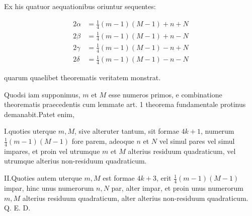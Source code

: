 Ex his quatuor aequationibus oriuntur sequentes:

\[
\begin{aligned}
2\alpha&=\tfrac14(m-1)(M-1)+n+N\\
2\beta&=\tfrac14(m-1)(M-1)+n-N\\
2\gamma&=\tfrac14(m-1)(M-1)-n+N\\
2\delta&=\tfrac14(m-1)(M-1)-n-N
\end{aligned}
\]

quarum quaelibet theorematis veritatem monstrat.


Quodsi iam supponimus, $m$ et $M$ esse numeros primos, e combinatione theorematis praecedentis cum lemmate art. 1 theorema fundamentale protinus demanabit.\quad Patet enim,

I.\quad quoties uterque $m,M$, sive alteruter tantum, sit formae $4k+1$, numerum $\frac14(m-1)(M-1)$ fore parem, adeoque $n$ et $N$ vel simul pares vel simul impares, et proin vel utrumque $m$ et $M$ alterius residuum quadraticum, vel utrumque alterius non-residuum quadraticum.

II.\quad Quoties autem uterque $m,M$ est formae $4k+3$, erit $\frac14(m-1)(M-1)$ impar, hinc unus numerorum $n,N$ par, alter impar, et proin unus numerorum $m,M$ alterius residuum quadraticum, alter alterius non-residuum quadraticum. Q. E. D.
